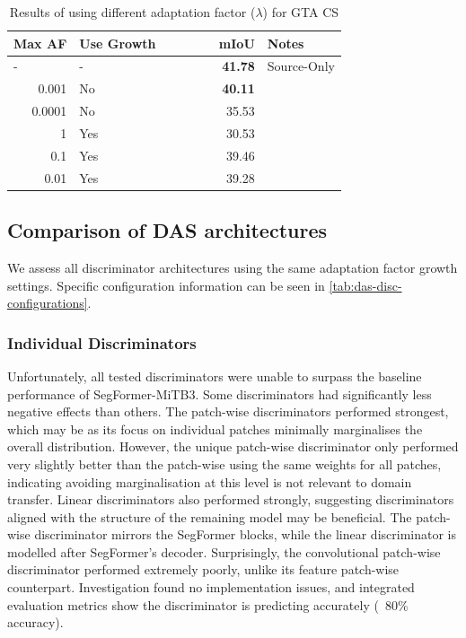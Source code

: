\documentclass[a4paper,12pt]{report}
\begin{document}
\begin{table}[]
    \centering
    \begin{tabular}{|r|l|r|l|}
        \hline
        \multicolumn{1}{|l|}{Max AF} & Use Growth & \multicolumn{1}{l|}{\ \ \ \ \ \ \ mIoU} & Notes       \\ \hline
        \multicolumn{1}{|l|}{-}      & -          & \textbf{41.78}                          & Source-Only \\ \hline
        0.001                        & No         & \textbf{40.11}                          &             \\ \hline
        0.0001                       & No         & 35.53                                   &             \\ \hline
        1                            & Yes        & 30.53                                   &             \\ \hline
        0.1                          & Yes        & 39.46                                   &             \\ \hline
        0.01                         & Yes        & 39.28                                   &             \\ \hline
    \end{tabular}
    \caption{Results of using different adaptation factor ($\lambda$) for GTA \textrightarrow CS}
\end{table}

\subsection{Comparison of DAS architectures}

We assess all discriminator architectures using the same adaptation factor growth settings. Specific configuration information can be seen in \autoref{tab:das-disc-configurations}.

\subsubsection{Individual Discriminators}
Unfortunately, all tested discriminators were unable to surpass the baseline performance of SegFormer-MiTB3. Some discriminators had significantly less negative effects than others. The patch-wise discriminators performed strongest, which may be as its focus on individual patches minimally marginalises the overall distribution. However, the unique patch-wise discriminator only performed very slightly better than the patch-wise using the same weights for all patches, indicating avoiding marginalisation at this level is not relevant to domain transfer. Linear discriminators also performed strongly, suggesting discriminators aligned with the structure of the remaining model may be beneficial. The patch-wise discriminator mirrors the SegFormer blocks, while the linear discriminator is modelled after SegFormer's decoder. Surprisingly, the convolutional patch-wise discriminator performed extremely poorly, unlike its feature patch-wise counterpart. Investigation found no implementation issues, and integrated evaluation metrics show the discriminator is predicting accurately (~80\% accuracy).
\end{document}
